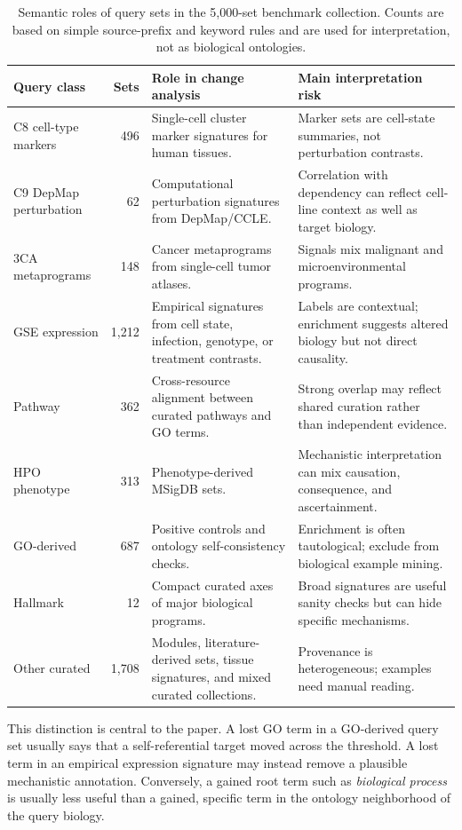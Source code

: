 \documentclass[11pt]{article}
\begin{document}
\begin{table}[t]
\centering
\caption{Semantic roles of query sets in the 5,000-set benchmark collection. Counts are based on simple source-prefix and keyword rules and are used for interpretation, not as biological ontologies.}
\label{tab:semantic-classes}
\footnotesize
\setlength{\tabcolsep}{4pt}
\begin{tabularx}{\textwidth}{l r Y Y}
\toprule
Query class & Sets & Role in change analysis & Main interpretation risk \\
\midrule
C8 cell-type markers & 496 & Single-cell cluster marker signatures for human tissues. & Marker sets are cell-state summaries, not perturbation contrasts. \\
C9 DepMap perturbation & 62 & Computational perturbation signatures from DepMap/CCLE. & Correlation with dependency can reflect cell-line context as well as target biology. \\
3CA metaprograms & 148 & Cancer metaprograms from single-cell tumor atlases. & Signals mix malignant and microenvironmental programs. \\
GSE expression & 1,212 & Empirical signatures from cell state, infection, genotype, or treatment contrasts. & Labels are contextual; enrichment suggests altered biology but not direct causality. \\
Pathway & 362 & Cross-resource alignment between curated pathways and GO terms. & Strong overlap may reflect shared curation rather than independent evidence. \\
HPO phenotype & 313 & Phenotype-derived MSigDB sets. & Mechanistic interpretation can mix causation, consequence, and ascertainment. \\
GO-derived & 687 & Positive controls and ontology self-consistency checks. & Enrichment is often tautological; exclude from biological example mining. \\
Hallmark & 12 & Compact curated axes of major biological programs. & Broad signatures are useful sanity checks but can hide specific mechanisms. \\
Other curated & 1,708 & Modules, literature-derived sets, tissue signatures, and mixed curated collections. & Provenance is heterogeneous; examples need manual reading. \\
\bottomrule
\end{tabularx}
\end{table}

This distinction is central to the paper. A lost GO term in a GO-derived query set usually says that a self-referential target moved across the threshold. A lost term in an empirical expression signature may instead remove a plausible mechanistic annotation. Conversely, a gained root term such as \emph{biological process} is usually less useful than a gained, specific term in the ontology neighborhood of the query biology.
\end{document}
